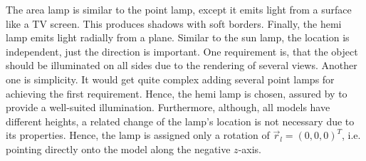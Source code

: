 The area lamp is similar to the point lamp, except it emits light from a surface like a TV screen.
This produces shadows with soft borders.
Finally, the hemi lamp emits light radially from a plane.
Similar to the sun lamp, the location is independent, just the direction is important.
One requirement is, that the object should be illuminated on all sides due to the rendering of several views.
Another one is simplicity.
It would get quite complex adding several point lamps for achieving the first requirement.
Hence, the hemi lamp is chosen, assured by  to provide a well-suited illumination.
Furthermore, although, all models have different heights, a related change of the lamp's location is not necessary due to its properties.
Hence, the lamp is assigned only a rotation of $\vec{r}_l = (0,0,0)^T$, i.e. pointing directly onto the model along the negative $z$-axis.

